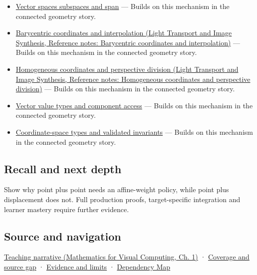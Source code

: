 \hypertarget{appendix-0659864c0aa3-used-by}{}

\begin{itemize}
\tightlist
\item
  \hyperref[appendix-173b52c063ae]{Vector spaces subspaces and span} --- Builds on this mechanism in the connected geometry story.
\item
  \href{../04-Light-Transport-and-Image-Synthesis/main.pdf\#nameddest=appendix-02b9d9a81dca}{Barycentric coordinates and interpolation (Light Transport and Image Synthesis, Reference notes: Barycentric coordinates and interpolation)} --- Builds on this mechanism in the connected geometry story.
\item
  \href{../04-Light-Transport-and-Image-Synthesis/main.pdf\#nameddest=appendix-cb3b26862282}{Homogeneous coordinates and perspective division (Light Transport and Image Synthesis, Reference notes: Homogeneous coordinates and perspective division)} --- Builds on this mechanism in the connected geometry story.
\item
  \hyperref[appendix-37a39984ba66]{Vector value types and component access} --- Builds on this mechanism in the connected geometry story.
\item
  \hyperref[appendix-380a220e2529]{Coordinate-space types and validated invariants} --- Builds on this mechanism in the connected geometry story.
\end{itemize}

\subsection{Recall and next depth}\label{appendix-0659864c0aa3-recall-and-next-depth}

\hypertarget{appendix-0659864c0aa3-recall-and-next-depth}{}

Show why point plus point needs an affine-weight policy, while point plus displacement does not. Full production proofs, target-specific integration and learner mastery require further evidence.

\subsection{Source and navigation}\label{appendix-0659864c0aa3-source-and-navigation}

\hypertarget{appendix-0659864c0aa3-source-and-navigation}{}

\href{../02-Mathematics-for-Visual-Computing/main.pdf\#nameddest=01-foundations-i-ch017-an-arrow-is-not-the-address-written-beside-it}{Teaching narrative (Mathematics for Visual Computing, Ch. 1)} · \hyperref[appendix-fd090d982a15-phase-6---parts-501-600]{Coverage and source gap} · \hyperref[appendix-a103e7846d21-phase-6---source-analysis-and-verification]{Evidence and limits} · \hyperref[appendix-4ad47bdd269a]{Dependency Map}
